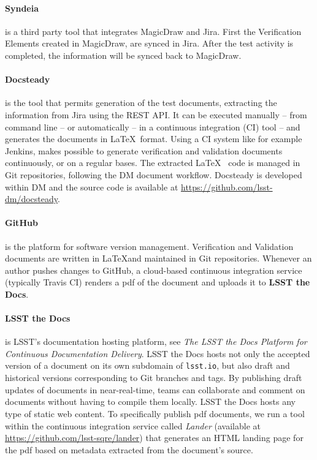\paragraph{Syndeia}
is a third party tool that integrates MagicDraw and Jira. First the Verification Elements created in MagicDraw,
are synced in Jira. After the test activity is completed, the information will be synced back to MagicDraw.

\paragraph{Docsteady}
is the tool that permits generation of the test documents, extracting the information from Jira using the REST API.
It can be executed manually -- from command line -- or automatically -- in a continuous integration (CI) tool -- 
and generates the documents in \LaTeX~format.
Using a CI system like for example Jenkins, makes possible to generate verification and validation documents continuously, or on a regular bases.
The extracted \LaTeX~ code is managed in Git repositories, following the  DM document workflow.
Docsteady is developed within DM and the source code is available at \url{https://github.com/lsst-dm/docsteady}.


\paragraph{GitHub}
is the platform for software version management.
Verification and Validation documents are written in \LaTeX and maintained in Git repositories.
Whenever an author pushes changes to GitHub, a cloud-based continuous integration service 
(typically Travis CI) renders a pdf of the document and uploads it to \textbf{LSST the Docs}.

\paragraph{LSST the Docs}
is LSST's documentation hosting platform, see \textit{The LSST the Docs Platform for Continuous Documentation Delivery}\cite{SQR-006}.
LSST the Docs hosts not only the accepted version of a document on its own subdomain of \texttt{lsst.io}, but also draft and
historical versions corresponding to Git branches and tags.
By publishing draft updates of documents in near-real-time, teams can collaborate and comment on documents without having to
compile them locally.
LSST the Docs hosts any type of static web content.
To specifically publish pdf documents, we run a tool within the continuous integration service called \textit{Lander}
(available at \url{https://github.com/lsst-sqre/lander})
that generates an HTML landing page for the pdf based on metadata extracted from the document's source.

